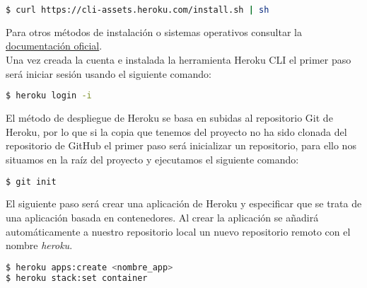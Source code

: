 \documentclass[../proyecto.tex]{subfiles}
\begin{document}
\begin{minipage}{\linewidth}
\begin{lstlisting}[language=bash, caption=Instalación de Heroku CLI, captionpos=b, frame=single]
$ curl https://cli-assets.heroku.com/install.sh | sh
\end{lstlisting}
\end{minipage}

Para otros métodos de instalación o sistemas operativos consultar la \href{https://devcenter.heroku.com/articles/heroku-cli\#download-and-install}{documentación oficial}.\\

Una vez creada la cuenta e instalada la herramienta Heroku CLI el primer paso será iniciar sesión usando el siguiente comando:\\

\begin{minipage}{\linewidth}
\begin{lstlisting}[language=bash, caption=Instalación de Heroku CLI, captionpos=b, frame=single]
$ heroku login -i
\end{lstlisting}
\end{minipage}

El método de despliegue de Heroku se basa en subidas al repositorio Git de Heroku, por lo que si la copia que tenemos del proyecto no ha sido clonada del repositorio de GitHub el primer paso será inicializar un repositorio, para ello nos situamos en la raíz del proyecto y ejecutamos el siguiente comando:\\

\begin{minipage}{\linewidth}
\begin{lstlisting}[language=bash, caption=Inicialización del repositorio para la aplicación de Heroku, captionpos=b, frame=single]
$ git init
\end{lstlisting}
\end{minipage}

El siguiente paso será crear una aplicación de Heroku y especificar que se trata de una aplicación basada en contenedores. Al crear la aplicación se añadirá automáticamente a nuestro repositorio local un nuevo repositorio remoto con el nombre \textit{heroku}. \\

\begin{minipage}{\linewidth}
\begin{lstlisting}[language=bash, caption=Creación de la aplicación con Heroku CLI, captionpos=b, frame=single]
$ heroku apps:create <nombre_app>
$ heroku stack:set container
\end{lstlisting}
\end{minipage}
\end{document}
